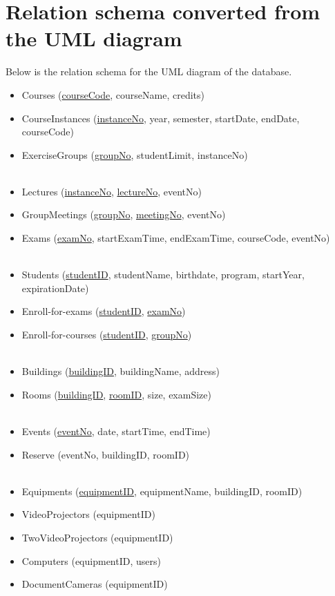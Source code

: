 \documentclass{article}
\begin{document}
\section{Relation schema converted from the UML diagram}
Below is the relation schema for the UML diagram of the database.
\begin{itemize}
	\item Courses (\underline{courseCode}, courseName, credits)
	\item CourseInstances (\underline{instanceNo}, year, semester, startDate, endDate, courseCode)
	\item ExerciseGroups (\underline{groupNo}, studentLimit, instanceNo)
	\\\\
	\item Lectures (\underline{instanceNo}, \underline{lectureNo}, eventNo)
	\item GroupMeetings (\underline{groupNo}, \underline{meetingNo}, eventNo)
	\item Exams (\underline{examNo}, startExamTime, endExamTime, courseCode, eventNo)
	\\\\
	\item Students (\underline{studentID}, studentName, birthdate, program, startYear, expirationDate)
	\item Enroll-for-exams (\underline{studentID}, \underline{examNo})
	\item Enroll-for-courses (\underline{studentID}, \underline{groupNo})
	\\\\
	\item Buildings (\underline{buildingID}, buildingName, address)
	\item Rooms (\underline{buildingID}, \underline{roomID}, size, examSize)
	\\\\
	\item Events (\underline{eventNo}, date, startTime, endTime)
	\item Reserve (eventNo, buildingID, roomID)
	\\\\
	\item Equipments (\underline{equipmentID}, equipmentName, buildingID, roomID)
	\item VideoProjectors (equipmentID)
	\item TwoVideoProjectors (equipmentID)
	\item Computers (equipmentID, users)
	\item DocumentCameras (equipmentID)
\end{itemize}
\end{document}
